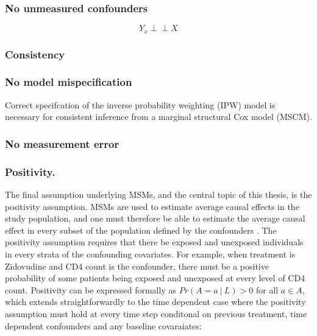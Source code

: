 \documentclass[11pt]{article}
\begin{document}
\subsubsection{No unmeasured
confounders}\label{no-unmeasured-confounders}

\[Y_{x} \perp\!\!\!\perp X\]

\subsubsection{Consistency}\label{consistency}

\citet{Cole2009} \citet{Pearl2010}

\subsubsection{No model mispecification}\label{no-model-mispecification}

Correct specifcation of the inverse probability weighting (IPW) model is
necessary for consistent inference from a marginal structural Cox model
(MSCM).

\subsubsection{No measurement error}\label{no-measurement-error}

\subsubsection{Positivity.}\label{positivity.}

The final assumption underlying MSMs, and the central topic of this
thesis, is the positivity assumption. MSMs are used to estimate average
causal effects in the study population, and one must therefore be able
to estimate the average causal effect in every subset of the population
defined by the confounders \citet{Cole2008}. The positivity assumption
requires that there be exposed and unexposed individuals in every strata
of the confounding covariates. For example, when treatment is Zidovudine
and CD4 count is the confounder, there must be a positive probability of
some patients being exposed and unexposed at every level of CD4 count.
Positivity can be expressed formally as \(Pr(A=a\ |\ L) > 0\) for all
\(a \in A\), which extends straightforwardly to the time dependent case
where the positivity assumption must hold at every time step conditonal
on previous treatment, time dependent confounders and any baseline
covaraiates:
\end{document}
